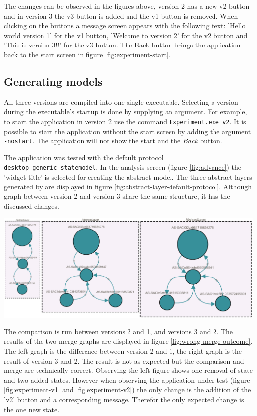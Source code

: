 The changes can be observed in the figures above, version 2 has a new v2 button and in version 3 the v3 button is added and the v1 button is removed. When clicking on the buttons a message screen appears with the following text: 'Hello world version 1' for the v1 button, 'Welcome to version 2' for the v2 button and 'This is version 3!!' for the v3 button. The Back button brings the application back to the start screen in figure \ref{fig:experiment-start}. 

\subsection{Generating models}
All three versions are compiled into one single executable. Selecting a version during the executable's startup is done by supplying an argument. For example, to start the application in version 2 use the command \verb|Experiment.exe v2|. It is possible to start the application without the start screen by adding the argument \verb|-nostart|. The application will not show the start and the \textit{Back} button. 

The application was tested with the \testar default protocol \verb|desktop_generic_statemodel|. In the \testar analysis screen (figure \ref{fig:advance}) the 'widget title' is selected for creating the abstract model.  The three abstract layers generated by \testar are displayed in figure \ref{fig:abstract-layer-default-protocol}. Although graph between version 2 and version 3 share the same structure, it has the discussed changes.

\begingroup
\captionsetup{type=figure}
\includegraphics[scale=0.45]{images/6-Default-Protocol-Abstract-Layer.png}
\label{fig:abstract-layer-default-protocol}
\endgroup

The comparison is run between versions 2 and 1, and versions 3 and 2. The results of the two merge graphs are displayed in figure \ref{fig:wrong-merge-outcome}. The left graph is the difference between version 2 and 1, the right graph is the result of version 3 and 2. The result is not as expected but the comparison and merge are technically correct. Observing the left figure shows one removal of state and two added states. However when observing the application under test (figure \ref{fig:experiment-v1} and \ref{fig:experiment-v2}) the only change is the addition of the 'v2' button and a corresponding message. Therefor the only expected change is the one new state. 

